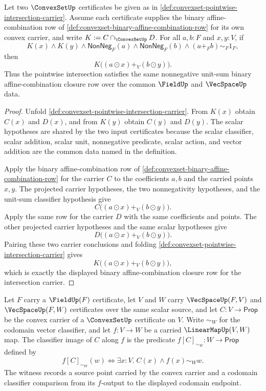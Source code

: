 \begin{theorem}
\label{thm:convexset-pointwise-intersection-affine-combination-closure}
Let two $\ConvexSetUp$ certificates be given as in \autoref{def:convexset-pointwise-intersection-carrier}. Assume each certificate supplies the binary affine-combination row of \autoref{def:convexset-binary-affine-combination-row} for its own convex carrier, and write $K:=C\cap_{\ConvexSetUp}D$. For all $a,b:F$ and $x,y:V$, if
$$
K(x)\land K(y)\land \mathsf{NonNeg}_F(a)\land \mathsf{NonNeg}_F(b)
\land (a+_F b)\sim_F 1_F,
$$
then
$$
K\bigl((a\odot x)+_V(b\odot y)\bigr).
$$
Thus the pointwise intersection satisfies the same nonnegative unit-sum binary affine-combination closure row over the common $\FieldUp$ and $\VecSpaceUp$ data.
\end{theorem}
\begin{proof}
Unfold \autoref{def:convexset-pointwise-intersection-carrier}. From $K(x)$ obtain $C(x)$ and $D(x)$, and from $K(y)$ obtain $C(y)$ and $D(y)$. The scalar hypotheses are shared by the two input certificates because the scalar classifier, scalar addition, scalar unit, nonnegative predicate, scalar action, and vector addition are the common data named in the definition.

Apply the binary affine-combination row of \autoref{def:convexset-binary-affine-combination-row} for the carrier $C$ to the coefficients $a,b$ and the carried points $x,y$. The projected carrier hypotheses, the two nonnegativity hypotheses, and the unit-sum classifier hypothesis give
$$
C\bigl((a\odot x)+_V(b\odot y)\bigr).
$$
Apply the same row for the carrier $D$ with the same coefficients and points. The other projected carrier hypotheses and the same scalar hypotheses give
$$
D\bigl((a\odot x)+_V(b\odot y)\bigr).
$$
Pairing these two carrier conclusions and folding \autoref{def:convexset-pointwise-intersection-carrier} gives
$$
K\bigl((a\odot x)+_V(b\odot y)\bigr),
$$
which is exactly the displayed binary affine-combination closure row for the intersection carrier.
\end{proof}

\begin{definition}
\label{def:convexset-linear-image-carrier}
Let $F$ carry a $\FieldUp(F)$ certificate, let $V$ and $W$ carry $\VecSpaceUp(F,V)$ and $\VecSpaceUp(F,W)$ certificates over the same scalar source, and let $C:V\to\mathsf{Prop}$ be the convex carrier of a $\ConvexSetUp$ certificate on $V$. Write $\sim_W$ for the codomain vector classifier, and let $f:V\to W$ be a carried $\LinearMapUp(V,W)$ map. The classifier image of $C$ along $f$ is the predicate $f[C]_{\sim_W}:W\to\mathsf{Prop}$ defined by
$$
f[C]_{\sim_W}(w)\Longleftrightarrow
\exists x:V.\; C(x)\land f(x)\sim_W w.
$$
The witness records a source point carried by the convex carrier and a codomain classifier comparison from its $f$-output to the displayed codomain endpoint.
\end{definition}


